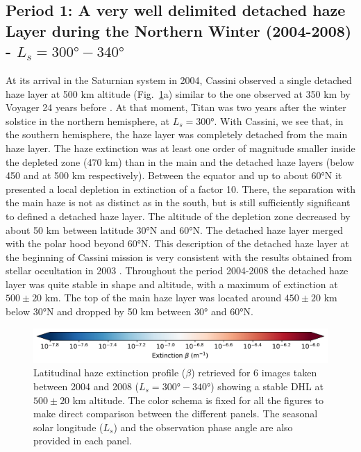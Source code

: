 \subsection{Period 1: A very well delimited detached haze Layer during the Northern Winter (2004-2008) - $L_s=\ang{300}-\ang{340}$}

At its arrival in the Saturnian system in 2004, Cassini observed a single detached haze layer at 500 km altitude
(Fig.~\ref{fig:dhl_2004_2008}a) similar to the one observed at 350 km by Voyager 24 years before
\citep{Smith1981}. At that moment, Titan was two years after the winter solstice in the northern hemisphere, at $L_s=\ang{300}$.
With Cassini, we see that, in the southern hemisphere, the haze layer was completely detached from the main haze layer.
The haze extinction was at least one order of magnitude smaller inside the depleted zone (470 km) than in the main and
the detached haze layers (below 450 and at 500 km respectively).
Between the equator and up to about \ang{60}N it presented a local depletion in extinction
of a factor 10. There, the separation with the main haze is not as distinct as in the south, but is still sufficiently significant to
defined a detached haze layer.
The altitude of the depletion zone decreased by about 50 km between latitude \ang{30}N  and \ang{60}N.
The detached haze layer merged with the polar hood beyond \ang{60}N. This description of the detached haze layer at
the beginning of Cassini mission is very consistent with the results obtained from stellar occultation in 2003 \citep{Sicardy2006}.
Throughout the period 2004-2008 the detached haze layer was quite stable in shape and  altitude, with a maximum of extinction
at $500 \pm 20$ km. The top of the main haze layer was located around $450 \pm 20$ km below \ang{30}N and dropped
by 50 km between \ang{30} and \ang{60}N.

\begin{figure}[!ht]
\includegraphics[width=.5\textwidth]{Fig/Extinction_colorbar}
\caption{Latitudinal haze extinction profile ($\beta$) retrieved for 6 images taken between 2004 and 2008
($L_s=\ang{300}-\ang{340}$) showing a stable DHL at $500 \pm 20$ km altitude.
The color schema is fixed for all the figures to make direct comparison
between the different panels. The seasonal solar longitude ($L_s$) and the observation phase angle are
also provided in each panel.}
\label{fig:dhl_2004_2008}
\end{figure}

